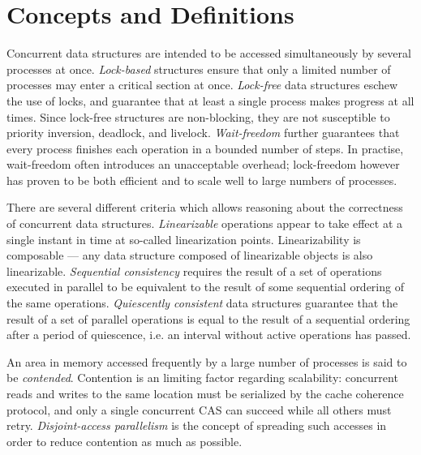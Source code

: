 \documentclass[a4paper,10pt]{article}
\begin{document}
\section{Concepts and Definitions}


Concurrent data structures are intended to be accessed simultaneously by several processes
at once. \emph{Lock-based} structures ensure that only a limited number of processes may enter
a critical section at once. \emph{Lock-free} data structures eschew the use of locks, and guarantee
that at least a single process makes progress at all times. Since lock-free structures are
non-blocking, they are not susceptible to priority inversion, deadlock, and livelock.
\emph{Wait-freedom} further guarantees that every process finishes each operation in a bounded number of steps. 
In practise, wait-freedom often introduces an unacceptable overhead; lock-freedom
however has proven to be both efficient and to scale well to large numbers of processes.


There are several different criteria which allows reasoning about the correctness of concurrent
data structures. \emph{Linearizable} \cite{herlihy1990linearizability} operations appear to take
effect at a single instant in time at so-called linearization points. Linearizability is composable ---
any data structure composed of linearizable objects is also linearizable.
\emph{Sequential consistency} \cite{lamport1979make} requires the result of a set of operations
executed in parallel to be equivalent to the result of some sequential ordering of the same
operations.
\emph{Quiescently consistent} \cite{shavit1996diffracting} data structures
guarantee that the result of a set of parallel operations is equal to the result of a sequential ordering
after a period of quiescence, i.e. an interval without active operations has passed.


An area in memory accessed frequently by a large number of processes is said to be \emph{contended}.
Contention is an limiting factor regarding scalability: concurrent reads and writes to the same 
location must be serialized by the cache coherence protocol, and only a single concurrent \ac{CAS} %
can succeed while all others must retry. \emph{Disjoint-access parallelism} is the concept of
spreading such accesses in order to reduce contention as much as possible. 
\end{document}
